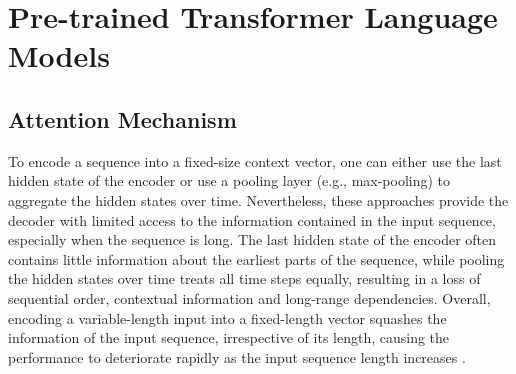 \section{Pre-trained Transformer Language Models}
\label{sec:chapter2-plms}





\subsection{Attention Mechanism}

To encode a sequence into a fixed-size context vector, one can either use the last hidden state of the encoder or use a pooling layer (e.g., max-pooling) to aggregate the hidden states over time. Nevertheless, these approaches provide the decoder with limited access to the information contained in the input sequence, especially when the sequence is long. The last hidden state of the encoder often contains little information about the earliest parts of the sequence, while pooling the hidden states over time treats all time steps equally, resulting in a loss of sequential order, contextual information and long-range dependencies. Overall, encoding a variable-length input into a fixed-length vector squashes the information of the input sequence, irrespective of its length, causing the performance to deteriorate rapidly as the input sequence length increases \citep{bahdanau2014neural}. 


